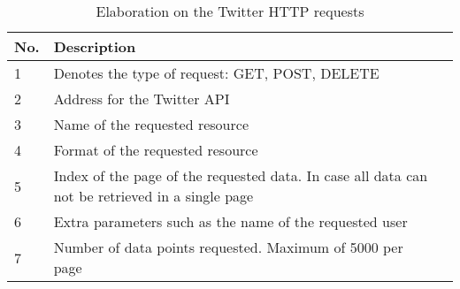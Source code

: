 \begin{table}[H] 
\begin{centering}
\begin{tabular}{|l|p{9cm}|l|}
No.			&	Description 		\\\hline
1			&	Denotes the type of request: GET, POST, DELETE 					\\\hline
2			&	Address for the Twitter \ac{API}					\\\hline
3			&	Name of the requested resource	   					\\\hline
4			&	Format of the requested resource					\\\hline
5			&	Index of the page of the requested data. In case all data can not be
retrieved in a single page \\\hline 
6			&	Extra parameters such as the name of the requested user					\\\hline
7			&	Number of data points requested. Maximum of 5000 per page					\\\hline
\end{tabular}
\caption{Elaboration on the Twitter HTTP requests}
\label{httpElaboration}
\end{centering}
\end{table}
